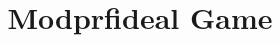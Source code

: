 \documentclass[a4paper,landscape]{article}
\title{Modprfideal Game}
\begin{document}
\maketitle
\begin{center}

\end{center}
\begin{center}

\end{center}
\begin{center}

\end{center}
\end{document}
